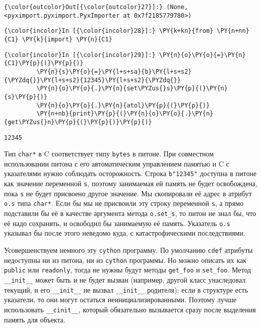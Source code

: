             \begin{Verbatim}[commandchars=\\\{\}]
{\color{outcolor}Out[{\color{outcolor}27}]:} (None, <pyximport.pyximport.PyxImporter at 0x7f2185779780>)
\end{Verbatim}
        
    \begin{Verbatim}[commandchars=\\\{\}]
{\color{incolor}In [{\color{incolor}28}]:} \PY{k+kn}{from} \PY{n+nn}{C1} \PY{k}{import} \PY{n}{C1}
\end{Verbatim}

    \begin{Verbatim}[commandchars=\\\{\}]
{\color{incolor}In [{\color{incolor}29}]:} \PY{n}{o}\PY{o}{=}\PY{n}{C1}\PY{p}{(}\PY{p}{)}
         \PY{n}{s}\PY{o}{=}\PY{l+s+sa}{b}\PY{l+s+s2}{\PYZdq{}}\PY{l+s+s2}{12345}\PY{l+s+s2}{\PYZdq{}}
         \PY{n}{o}\PY{o}{.}\PY{n}{set\PYZus{}s}\PY{p}{(}\PY{n}{s}\PY{p}{)}
         \PY{n}{o}\PY{o}{.}\PY{n}{atol}\PY{p}{(}\PY{p}{)}
         \PY{n+nb}{print}\PY{p}{(}\PY{n}{o}\PY{o}{.}\PY{n}{get\PYZus{}n}\PY{p}{(}\PY{p}{)}\PY{p}{)}
\end{Verbatim}

    \begin{Verbatim}[commandchars=\\\{\}]
12345

    \end{Verbatim}

    Тип \texttt{char*} в C соответствует типу \texttt{bytes} в питоне. При
совместном использовании питона с его автоматическим управлением памятью
и C с указателями нужно соблюдать осторожность. Строка \texttt{b"12345"}
доступна в питоне как значение переменной \texttt{s}, поэтому занимаемая
ей память не будет освобождена, пока \texttt{s} не будет присвоено
другое значение. Мы скопировали её адрес в атрибут \texttt{o.s} типа
\texttt{char*}. Если бы мы не присвоили эту строку переменной
\texttt{s}, а прямо подставили бы её в качестве аргумента метода
\texttt{o.set\_s}, то питон не знал бы, что её надо сохранять, и
освободил бы занимаемую её память. Указатель \texttt{o.s} указывал бы
после этого неведомо куда, с катастрофическими последствиями.

Усовершенствуем немного эту \texttt{cython} программу. По умолчанию
\texttt{cdef} атрибуты недоступны ни из питона, ни из \texttt{cython}
программы. Но можно описать их как \texttt{public} или
\texttt{readonly}, тогда не нужны будут методы \texttt{get\_foo} и
\texttt{set\_foo}. Метод \texttt{\_\_init\_\_} может быть и не будет
вызван (например, другой класс унаследовал текущий, и его
\texttt{\_\_init\_\_} не вызвал \texttt{\_\_init\_\_} родителя); если в
структуре есть указатели, то они могут остаться неинициализированными.
Поэтому лучше использовать \texttt{\_\_cinit\_\_}, который обязательно
вызывается сразу после выделения память для объекта.

